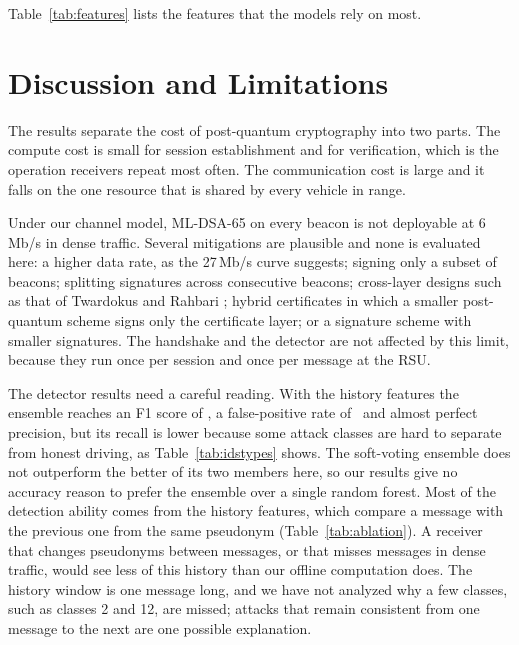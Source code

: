 \documentclass[journal,twoside]{IEEEtran}
\begin{document}


Table~\ref{tab:features} lists the features that the models rely on most.

\section{Discussion and Limitations}
\label{sec:discussion}

The results separate the cost of post-quantum cryptography into two parts. The compute cost is small for session establishment and for verification, which is the operation receivers repeat most often. The communication cost is large and it falls on the one resource that is shared by every vehicle in range.

Under our channel model, ML-DSA-65 on every beacon is not deployable at 6\,Mb/s in dense traffic. Several mitigations are plausible and none is evaluated here: a higher data rate, as the 27\,Mb/s curve suggests; signing only a subset of beacons; splitting signatures across consecutive beacons; cross-layer designs such as that of Twardokus and Rahbari \cite{twardokus2026}; hybrid certificates in which a smaller post-quantum scheme signs only the certificate layer; or a signature scheme with smaller signatures. The handshake and the detector are not affected by this limit, because they run once per session and once per message at the RSU.

The detector results need a careful reading. With the history features the ensemble reaches an F1 score of \idsEnsF, a false-positive rate of \idsEnsFPR\ and almost perfect precision, but its recall is lower because some attack classes are hard to separate from honest driving, as Table~\ref{tab:idstypes} shows. The soft-voting ensemble does not outperform the better of its two members here, so our results give no accuracy reason to prefer the ensemble over a single random forest. Most of the detection ability comes from the history features, which compare a message with the previous one from the same pseudonym (Table~\ref{tab:ablation}). A receiver that changes pseudonyms between messages, or that misses messages in dense traffic, would see less of this history than our offline computation does. The history window is one message long, and we have not analyzed why a few classes, such as classes 2 and 12, are missed; attacks that remain consistent from one message to the next are one possible explanation.
\end{document}

